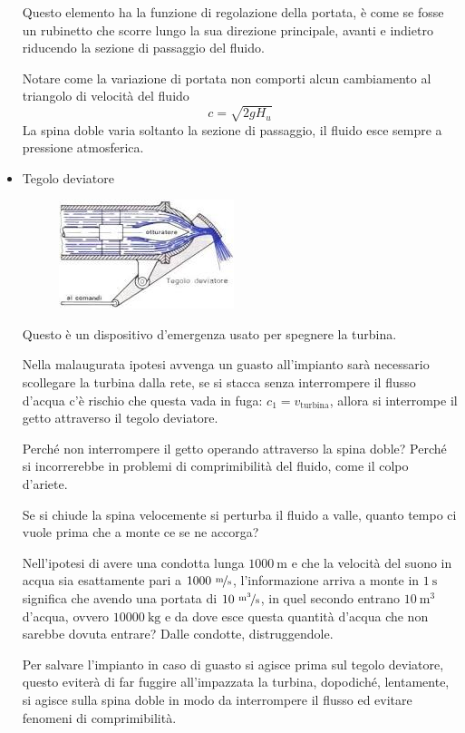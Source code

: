 \documentclass[a4paper, 15pt]{article}
\begin{document}
\begin{adjustwidth}{2in}{}
\begin{itemize}
\begin{figure}[H]
		 	\label{fig:turbinapelton4}
		 \end{figure}
		 Questo elemento ha la funzione di regolazione della portata, è come se fosse un rubinetto che scorre lungo la sua direzione principale, avanti e indietro riducendo la sezione di passaggio del fluido. 
		 
		 Notare come la variazione di portata non comporti alcun cambiamento al triangolo di velocità del fluido
		 \[c = \sqrt{2gH_u}\] La spina doble varia soltanto la sezione di passaggio, il fluido esce sempre a pressione atmosferica. 
		 
		 \item Tegolo deviatore
		 \begin{figure}[H]
		 	\centering
		 	\includegraphics[width=0.4\linewidth]{immagini/turbinapelton5}
		 	\label{fig:turbinapelton5}
		 \end{figure}
	 	Questo è un dispositivo d'emergenza usato per spegnere la turbina. 
	 	
	 	Nella malaugurata ipotesi avvenga un guasto all'impianto sarà necessario scollegare la turbina dalla rete, se si stacca senza interrompere il flusso d'acqua c'è rischio che questa vada in fuga: $c_1=v_{\text{turbina}}$, allora si interrompe il getto attraverso il tegolo deviatore. \newline 
	 	
	 	Perché non interrompere il getto operando attraverso la spina doble? Perché si incorrerebbe in problemi di comprimibilità del fluido, come il colpo d'ariete. 
	 	
	 	Se si chiude la spina velocemente si perturba il fluido a valle, quanto tempo ci vuole prima che a monte ce se ne accorga? 
	 	
	 	Nell'ipotesi di avere una condotta lunga $1000~\text{m}$ e che la velocità del suono in acqua sia esattamente pari a $1000~\nicefrac{\text{m}}{\text{s}}$, l'informazione arriva a monte in $1~\text{s}$ significa che avendo una portata di $10~\nicefrac{\text{m}^3}{\text{s}}$, in quel secondo entrano $10~\text{m}^3$ d'acqua, ovvero $10000~\text{kg}$ e da dove esce questa quantità d'acqua che non sarebbe dovuta entrare? Dalle condotte, distruggendole. \newline 
	 	
	 	Per salvare l'impianto in caso di guasto si agisce prima sul tegolo deviatore, questo eviterà di far fuggire all'impazzata la turbina, dopodiché, lentamente, si agisce sulla spina doble in modo da interrompere il flusso ed evitare fenomeni di comprimibilità. 
	\end{itemize}
\end{adjustwidth}
\end{document}

